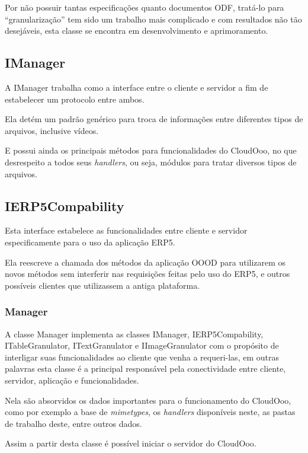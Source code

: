 Por não possuir tantas especificações quanto documentos ODF, tratá-lo para ``granularização'' tem sido um trabalho mais complicado e com resultados não tão desejáveis, esta classe se encontra em desenvolvimento e aprimoramento.


\subsection{IManager}

A IManager trabalha como a interface entre o cliente e servidor a fim de estabelecer um protocolo entre ambos.

Ela detém um padrão genérico para troca de informações entre diferentes tipos de arquivos, inclusive vídeos. 

E possui ainda os principais métodos para funcionalidades do CloudOoo, no que desrespeito a todos seus \textit{handlers}, ou seja, módulos para tratar diversos tipos de arquivos.


\subsection{IERP5Compability}

Esta interface estabelece as funcionalidades entre cliente e servidor especificamente para o uso da aplicação ERP5. 

Ela reescreve a chamada dos métodos da aplicação OOOD para utilizarem os novos métodos sem interferir nas requisições feitas pelo uso do ERP5, e outros possíveis clientes que utilizassem a antiga plataforma.


\subsubsection{Manager}

A classe Manager implementa as classes IManager, IERP5Compability, ITableGranulator, ITextGranulator e IImageGranulator com o propósito de interligar suas funcionalidades ao cliente que venha a requeri-las, em outras palavras esta classe é a principal responsável pela conectividade entre cliente, servidor, aplicação e funcionalidades.

Nela são absorvidos os dados importantes para o funcionamento do CloudOoo, como por exemplo a base de \textit{mimetypes}, os \textit{handlers} disponíveis neste, as pastas de trabalho deste, entre outros dados.

Assim a partir desta classe é possível iniciar o servidor do CloudOoo.
